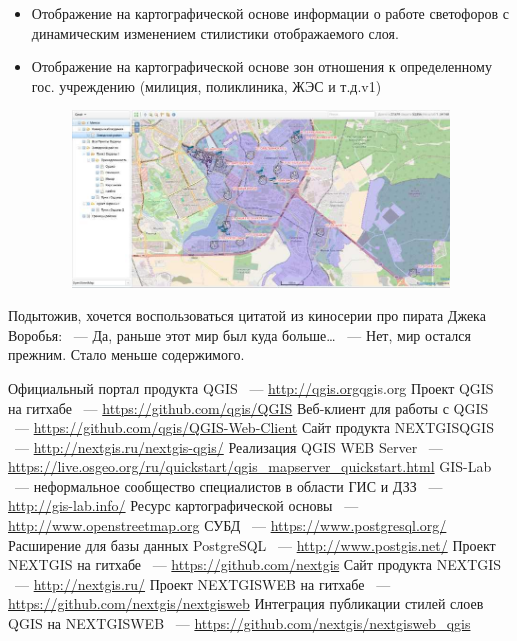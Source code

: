 \documentclass[10pt, a5paper]{article}
\begin{document}
\begin{itemize}
  \item Отображение на картографической основе информации о работе светофоров с динамическим изменением стилистики отображаемого слоя.
  \item Отображение на картографической основе зон отношения к определенному гос. учреждению (милиция, поликлиника, \linebreak ЖЭС и т.д.v1)

\begin{center}

\begin{figure}[h!]
  \centering
  \includegraphics[width=10cm]{stepanov4.jpg}
  
  \label{Stepanov4}
\end{figure}

\end{center}

\end{itemize}

Подытожив, хочется воспользоваться цитатой из киносерии про пирата Джека Воробья:
 ~--- Да, раньше этот мир был куда больше\ldots{}
 ~--- Нет, мир остался прежним. Стало меньше содержимого.

\begin{thebibliography}{99}

Официальный портал продукта QGIS ~---  \url{http://qgis.org}{qgis.org}
Проект QGIS на гитхабе ~--- \url{https://github.com/qgis/QGIS}
Веб-клиент для работы с QGIS ~--- \url{https://github.com/qgis/QGIS-Web-Client}
Сайт продукта NEXTGISQGIS ~--- \url{http://nextgis.ru/nextgis-qgis/}
Реализация QGIS WEB Server ~--- \url{https://live.osgeo.org/ru/quickstart/qgis_mapserver_quickstart.html}
GIS-Lab ~--- неформальное сообщество специалистов в области ГИС и ДЗЗ ~--- \url{http://gis-lab.info/}
Ресурс картографической основы ~--- \url{http://www.openstreetmap.org}
СУБД ~--- \url{https://www.postgresql.org/}
Расширение для базы данных PostgreSQL ~---  \url{http://www.postgis.net/}
Проект NEXTGIS на гитхабе ~--- \url{https://github.com/nextgis}
Сайт продукта NEXTGIS ~--- \url{http://nextgis.ru/}
Проект NEXTGISWEB на гитхабе ~--- \url{https://github.com/nextgis/nextgisweb}
Интеграция публикации стилей слоев QGIS на NEXTGISWEB ~--- \url{https://github.com/nextgis/nextgisweb_qgis}
\end{thebibliography}
\end{document}
